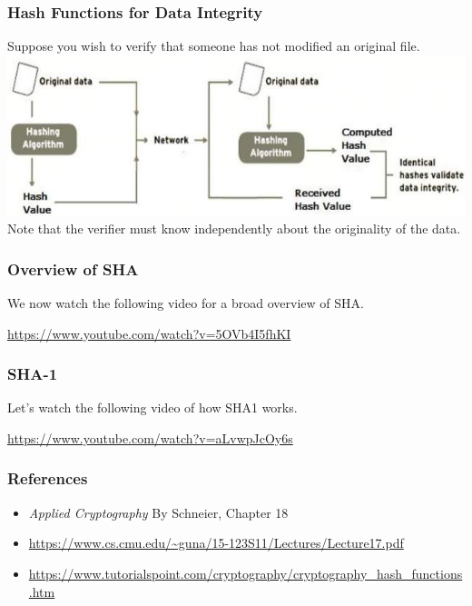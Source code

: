 \documentclass{beamer}
\newcommand{\<}{\langle}
\renewcommand{\>}{\rangle}
\begin{document}
\begin{frame}
\frametitle{Hash Functions for Data Integrity}

Suppose you wish to verify that someone has not modified an original file. 
\includegraphics[scale=.4]{IMG/dic}
Note that the verifier must know independently about the originality of the data. 
\end{frame}


\begin{frame}
\frametitle{Overview of SHA}

We now watch the following video  for a broad overview of SHA. 

\url{https://www.youtube.com/watch?v=5OVb4I5fhKI}
\end{frame}


\begin{frame}
\frametitle{SHA-1}

Let's watch the following video of how SHA1 works.

\url{https://www.youtube.com/watch?v=aLvwpJcOy6s}
\end{frame}

\begin{frame}
\frametitle{References}

\begin{itemize}
\item \emph{Applied Cryptography} By Schneier, Chapter 18
\item \url{https://www.cs.cmu.edu/~guna/15-123S11/Lectures/Lecture17.pdf}
\item \url{https://www.tutorialspoint.com/cryptography/cryptography_hash_functions.htm}
\end{itemize}
\end{frame}
\end{document}
